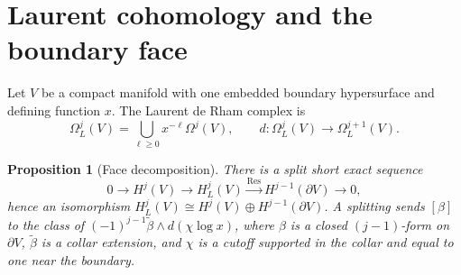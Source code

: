 \documentclass[11pt,oneside,reqno]{article}
\theoremstyle{plain}
\newtheorem{proposition}[theorem]{Proposition}
\theoremstyle{definition}
\theoremstyle{remark}
\begin{document}
\section{Laurent cohomology and the boundary face}\label{sec:laurent}

Let \(V\) be a compact manifold with one embedded boundary hypersurface and
defining function \(x\). The Laurent de Rham complex is
\[
 \Omega_L^j(V)=\bigcup_{\ell\geq0}x^{-\ell}\Omega^j(V),
 \qquad d:\Omega_L^j(V)\to\Omega_L^{j+1}(V).
\]

\begin{proposition}[Face decomposition]\label{prop:face}
There is a split short exact sequence
\[
 0\to H^j(V)\to H_L^j(V)\xrightarrow{\operatorname{Res}}
 H^{j-1}(\partial V)\to0,
\]
hence an isomorphism
\(H_L^j(V)\cong H^j(V)\oplus H^{j-1}(\partial V)\).
A splitting sends \([\beta]\) to the class of
\((-1)^{j-1}\widetilde\beta\wedge d(\chi\log x)\), where \(\beta\) is a
closed \((j-1)\)-form on \(\partial V\), \(\widetilde\beta\) is a collar
extension, and \(\chi\) is a cutoff supported in the collar and equal to
one near the boundary.
\end{proposition}
\end{document}
